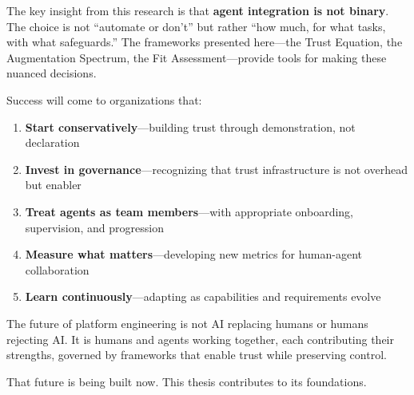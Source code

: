 The key insight from this research is that \textbf{agent integration is not binary}. The choice is not ``automate or don't'' but rather ``how much, for what tasks, with what safeguards.'' The frameworks presented here---the Trust Equation, the Augmentation Spectrum, the Fit Assessment---provide tools for making these nuanced decisions.

Success will come to organizations that:
\begin{enumerate}
    \item \textbf{Start conservatively}---building trust through demonstration, not declaration
    \item \textbf{Invest in governance}---recognizing that trust infrastructure is not overhead but enabler
    \item \textbf{Treat agents as team members}---with appropriate onboarding, supervision, and progression
    \item \textbf{Measure what matters}---developing new metrics for human-agent collaboration
    \item \textbf{Learn continuously}---adapting as capabilities and requirements evolve
\end{enumerate}

The future of platform engineering is not AI replacing humans or humans rejecting AI. It is humans and agents working together, each contributing their strengths, governed by frameworks that enable trust while preserving control.

That future is being built now. This thesis contributes to its foundations.
